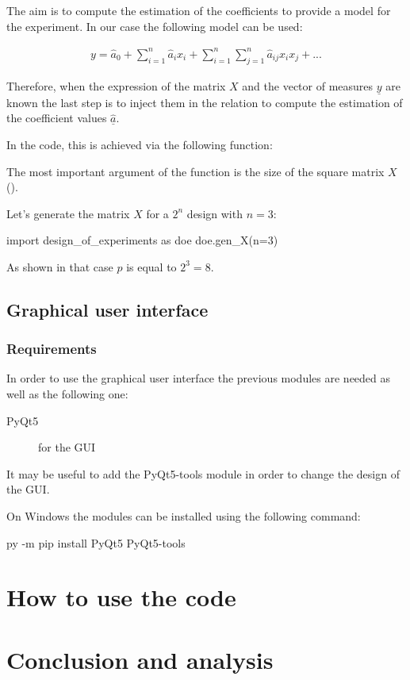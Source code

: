\documentclass[english, 12 pt, openany, oneside]{book}
\begin{document}
The aim is to compute the estimation of the coefficients to provide a model for the experiment. In our case the following model can be used:

\begin{align*}
y = \hat{a}_0 + \sum^n_{i=1} \hat{a}_i x_i + \sum^n_{i=1} \sum^n_{j=1} \hat{a}_{ij} x_i {x}_j + ...
\end{align*}

Therefore, when the expression of the matrix ${X}$ and the vector of measures $\underline{y}$ are known the last step is to inject them in the relation to compute the estimation of the coefficient values $\hat{\underline{a}}$. 

In the code, this is achieved via the following function:\\ 

The most important argument of the function is the size of the square matrix $X$ ().

Let's generate the matrix $X$ for a $2^n$ design with $n=3$:

\begin{pyconsole}[][breaklines]
import design_of_experiments as doe
doe.gen_X(n=3)
\end{pyconsole}

As shown in that case $p$ is equal to $2^3=8$.

\section{Graphical user interface}
\subsection{Requirements}
In order to use the graphical user interface the previous modules are needed as well as the following one:

\begin{description}
\item[PyQt5] for the GUI
\end{description}

It may be useful to add the PyQt5-tools module in order to change the design of the GUI.

On Windows the modules can be installed using the following command:
\begin{pyverbatim}
py -m pip install PyQt5 PyQt5-tools
\end{pyverbatim}

\chapter{How to use the code}

\chapter*{Conclusion and analysis}

\printbibliography
\end{document}

